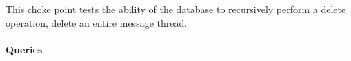 
This choke point tests the ability of the database to recursively perform a delete operation, \eg delete an entire message thread.


\paragraph{Queries}
{\raggedright

}